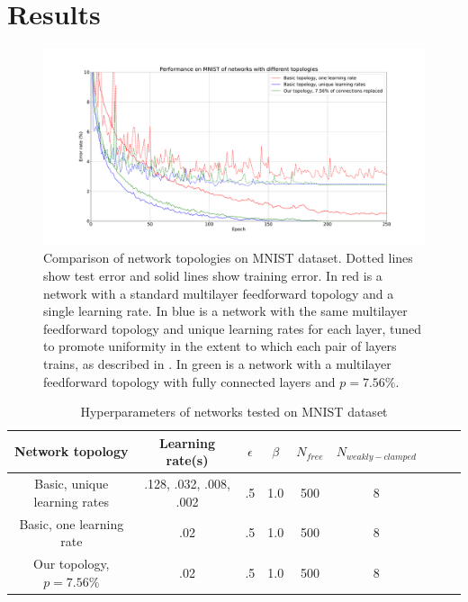 \documentclass{article}
\begin{document}
\section{Results}

\begin{figure}
  \centering
  \includegraphics[width=\textwidth]{figures/MNIST_network_comparison.pdf}
  \caption{Comparison of network topologies on MNIST dataset. Dotted lines show test error and solid lines show training error. In red is a network with a standard multilayer feedforward topology and a single learning rate. In blue is a network with the same multilayer feedforward topology and unique learning rates for each layer, tuned to promote uniformity in the extent to which each pair of layers trains, as described in \cite{scellier17}. In green is a network with a multilayer feedforward topology with fully connected layers and $p=7.56\%$.}
  \label{fig:mnist_comparison}
\end{figure}

\begin{table}
\begin{center}
\begin{tabular}{|c|c|c|c|c|c|c|c|c|}
\hline
Network topology & Learning rate(s) & $\epsilon$ & $\beta$ & $N_{free}$ & $N_{weakly-clamped}$\\\hline\hline
Basic, unique learning rates & .128, .032, .008, .002 & .5 & 1.0 & 500 & 8 \\\hline
Basic, one learning rate & .02 & .5 & 1.0 & 500 & 8  \\\hline
Our topology, $p=7.56\%$ & .02 & .5 & 1.0 & 500 & 8 \\\hline
\end{tabular}
\end{center}
\caption{Hyperparameters of networks tested on MNIST dataset}
\label{table:hyperparameters}
\end{table}
\end{document}
